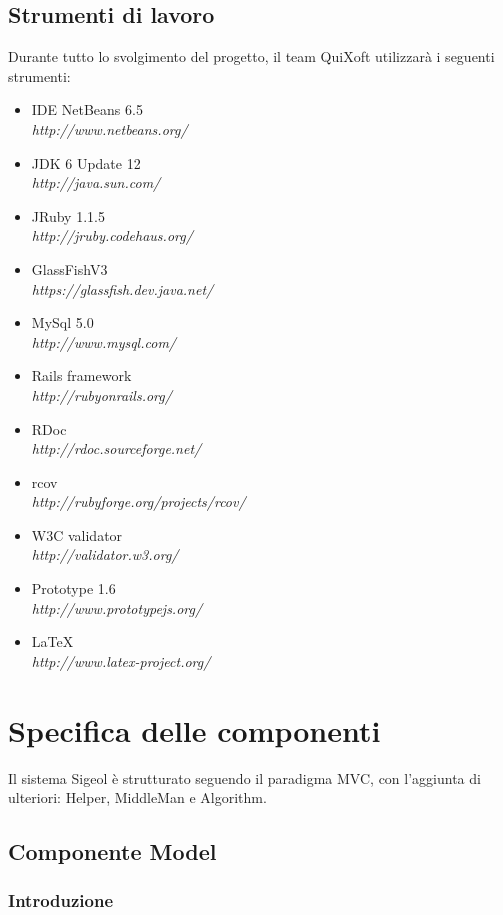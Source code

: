 \documentclass[11pt,a4paper]{article}
\begin{document}
\subsection{Strumenti di lavoro}
Durante tutto lo svolgimento del progetto, il team QuiXoft utilizzarà i seguenti strumenti:
\begin{itemize}
 \item IDE NetBeans 6.5 \\ \textit{http://www.netbeans.org/}
 \item JDK 6 Update 12 \\ \textit{http://java.sun.com/}
 \item JRuby 1.1.5 \\ \textit{http://jruby.codehaus.org/}
 \item GlassFishV3 \\ \textit{https://glassfish.dev.java.net/}
 \item MySql 5.0 \\ \textit{http://www.mysql.com/}
 \item Rails framework \\ \textit{http://rubyonrails.org/}
 \item RDoc \\ \textit{http://rdoc.sourceforge.net/}
 \item rcov \\ \textit{http://rubyforge.org/projects/rcov/}
 \item W3C validator \\ \textit {http://validator.w3.org/}
 \item Prototype 1.6 \\ \textit {http://www.prototypejs.org/}
 \item \LaTeX \\ \textit {http://www.latex-project.org/}
\end{itemize}

\section{Specifica delle componenti}
Il sistema Sigeol è strutturato seguendo il paradigma MVC, con l'aggiunta di ulteriori: Helper, MiddleMan e Algorithm.
\subsection{Componente Model}\label{model}
\subsubsection{Introduzione}
\end{document}
